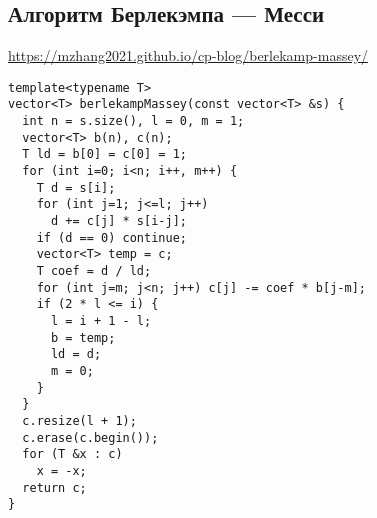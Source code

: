 \subsection{Алгоритм Берлекэмпа --- Месси}
\underline{\url{https://mzhang2021.github.io/cp-blog/berlekamp-massey/}}
\begin{lstlisting}
template<typename T>
vector<T> berlekampMassey(const vector<T> &s) {
  int n = s.size(), l = 0, m = 1;
  vector<T> b(n), c(n);
  T ld = b[0] = c[0] = 1;
  for (int i=0; i<n; i++, m++) {
    T d = s[i];
    for (int j=1; j<=l; j++)
      d += c[j] * s[i-j];
    if (d == 0) continue;
    vector<T> temp = c;
    T coef = d / ld;
    for (int j=m; j<n; j++) c[j] -= coef * b[j-m];
    if (2 * l <= i) {
      l = i + 1 - l;
      b = temp;
      ld = d;
      m = 0;
    }
  }
  c.resize(l + 1);
  c.erase(c.begin());
  for (T &x : c)
    x = -x;
  return c;
}  
\end{lstlisting}